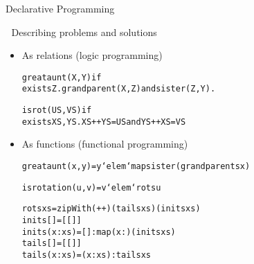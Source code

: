 \documentclass{popl}
\newenvironment{smalltt}{\begin{alltt}\smaller}{\end{alltt}}
\begin{document}
\begin{foil} 
\begin{cframed}
Declarative Programming
\end{cframed}

Describing problems and solutions
\begin{itemize}

\item As relations (logic programming)
\begin{smalltt}
    greataunt(X, Y)  if 
       exists Z . grandparent(X, Z) and sister(Z, Y).
    
    isrot(US, VS) if 
       exists XS, YS . XS++YS=US and YS++XS=VS
\end{smalltt}

\item As functions (functional programming)
\begin{smalltt}
    greataunt(x, y)  = y `elem` map sister (grandparents x)
    
    isrotation(u, v) = v `elem` rots u
    
    rots  xs     = zipWith (++) (tails xs) (inits xs)
    inits []     = [[]]
    inits (x:xs) = []: map (x:) (inits xs)
    tails []     = [[]]
    tails (x:xs) = (x:xs): tails xs
\end{smalltt}
\end{itemize}
\end{foil}
\end{document}
